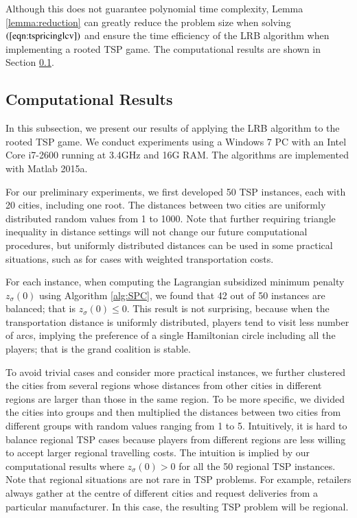 \documentclass[authoryear,review,12pt]{elsarticle}
\begin{document}
Although this does not guarantee polynomial time complexity, Lemma \ref{lemma:reduction} can greatly reduce the problem size when solving $(\ref{eqn:tspricinglcv})$ and ensure the time efficiency of the LRB algorithm when implementing a rooted TSP game. The computational results are shown in Section \ref{section:computationalresults}.



\subsection{Computational Results}\label{section:computationalresults}
In this subsection, we present our results of applying the LRB algorithm to the rooted TSP game.
We conduct experiments using a Windows 7 PC with an Intel Core i7-2600 running at 3.4GHz and 16G RAM.
The algorithms are implemented with Matlab 2015a.

For our preliminary experiments, we first developed 50 TSP instances, each with 20 cities, including one root.
The distances between two cities are uniformly distributed random values from 1 to 1000.
Note that further requiring triangle inequality in distance settings will not change our future computational procedures, but uniformly distributed distances can be used in some practical situations, such as for cases with weighted transportation costs.

For each instance, when computing the Lagrangian subsidized minimum penalty $z_{\sigma}(0)$ using Algorithm \ref{alg:SPC}, we found that 42 out of 50 instances are balanced; that is $z_{\sigma}(0) \leq 0$.
This result is not surprising, because when the transportation distance is uniformly distributed, players tend to visit less number of arcs, implying the preference of a single Hamiltonian circle including all the players; that is the grand coalition is stable.


To avoid trivial cases and consider more practical instances, we further clustered the cities from several regions whose distances from other cities in different regions are larger than those in the same region.
To be more specific, we divided the cities into groups and then multiplied the distances between two cities from different groups with random values ranging from 1 to 5.
Intuitively, it is hard to balance regional TSP cases because players from different regions are less willing to accept larger regional travelling costs.
The intuition is implied by our computational results where $z_{\sigma}(0) > 0$ for all the 50 regional TSP instances.
Note that regional situations are not rare in TSP problems.
For example, retailers always gather at the centre of different cities and request deliveries from a particular manufacturer.
In this case, the resulting TSP problem will be regional.
\end{document}
